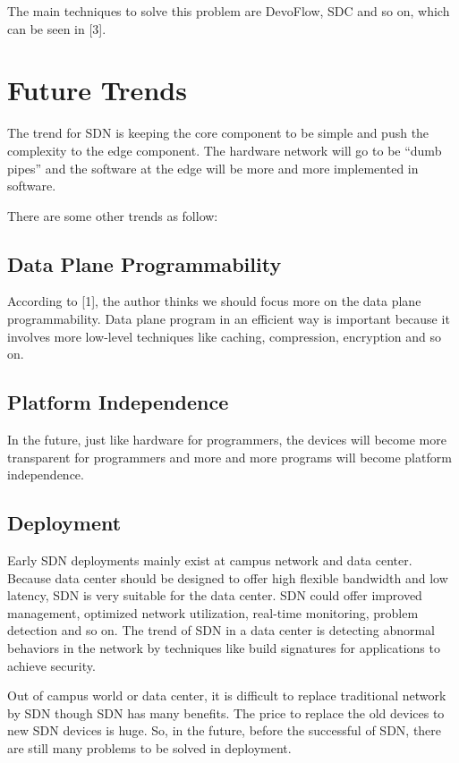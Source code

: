 \documentclass[conference]{IEEEtran}
\begin{document}
  The main techniques to solve this problem are DevoFlow, SDC and so on, which can be seen in [3].



\section{Future Trends}
The trend for SDN is keeping the core component to be simple and push the complexity to the edge component.
The hardware network will go to be “dumb pipes” and the software at the edge will be more and more implemented in software.
 
There are some other trends as follow:

\subsection{Data Plane Programmability}
According to [1], the author thinks we should focus more on the data plane programmability. Data plane program in an efficient way is important because it involves more low-level techniques like caching, compression, encryption and so on.


\subsection{Platform Independence}
In the future, just like hardware for programmers, the devices will become more transparent for programmers and more and more programs will become platform independence.


\subsection{Deployment}
Early SDN deployments mainly exist at campus network and data center. Because data center should be designed to offer high flexible bandwidth and low latency, SDN is very suitable for the data center. SDN could offer improved management, optimized network utilization, real-time monitoring, problem detection and so on. The trend of SDN in a data center is detecting abnormal behaviors in the network by techniques like build signatures for applications to achieve security. 

Out of campus world or data center, it is difficult to replace traditional network by SDN though SDN has many benefits. The price to replace the old devices to new SDN devices is huge. So, in the future, before the successful of SDN, there are still many problems to be solved in deployment.
\end{document}
